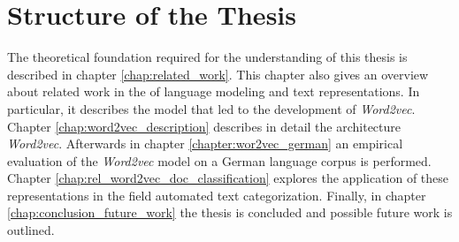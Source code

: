 \section{Structure of the Thesis}
\label{sec:structure-thesis}

The theoretical foundation required for the understanding of this thesis is
described in chapter \ref{chap:related_work}. This chapter also gives an
overview about related work in the of language modeling and text
representations.  In particular, it describes the model that led to the
development of \textit{Word2vec}.
 Chapter \ref{chap:word2vec_description} describes in detail the architecture
 \textit{Word2vec}. Afterwards in  chapter \ref{chapter:wor2vec_german}  
 an empirical evaluation of the \textit{Word2vec} model on a German language
 corpus is performed.  Chapter \ref{chap:rel_word2vec_doc_classification} explores the
 application of these representations in the field automated text
 categorization. Finally, in chapter \ref{chap:conclusion_future_work} the
 thesis is concluded and possible future work is outlined.






 



